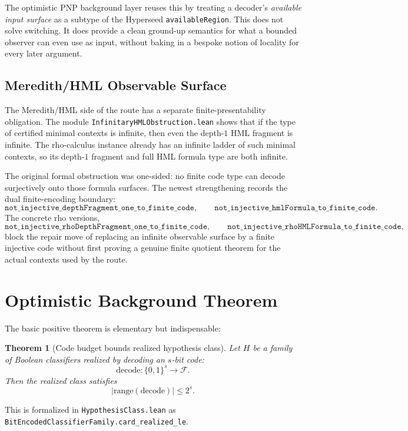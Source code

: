 \documentclass[11pt]{article}
\newtheorem{theorem}{Theorem}[section]
\theoremstyle{remark}
\begin{document}
The optimistic PNP background layer reuses this by treating a decoder's \emph{available
input surface} as a subtype of the Hyperseed \texttt{availableRegion}.  This does not solve
switching.  It does provide a clean ground-up semantics for what a bounded observer can even
use as input, without baking in a bespoke notion of locality for every later argument.

\subsection{Meredith/HML Observable Surface}

The Meredith/HML side of the route has a separate finite-presentability obligation.  The module
\texttt{InfinitaryHMLObstruction.lean} shows that if the type of certified minimal contexts is
infinite, then even the depth-\(1\) HML fragment is infinite.  The rho-calculus instance already
has an infinite ladder of such minimal contexts, so its depth-\(1\) fragment and full HML formula
type are both infinite.

The original formal obstruction was one-sided: no finite code type can decode surjectively onto
those formula surfaces.  The newest strengthening records the dual finite-encoding boundary:
\[
  \texttt{not\_injective\_depthFragment\_one\_to\_finite\_code},
  \qquad
  \texttt{not\_injective\_hmlFormula\_to\_finite\_code}.
\]
The concrete rho versions,
\[
  \texttt{not\_injective\_rhoDepthFragment\_one\_to\_finite\_code},
  \qquad
  \texttt{not\_injective\_rhoHMLFormula\_to\_finite\_code},
\]
block the repair move of replacing an infinite observable surface by a finite injective code
without first proving a genuine finite quotient theorem for the actual contexts used by the route.

\section{Optimistic Background Theorem}

The basic positive theorem is elementary but indispensable:

\begin{theorem}[Code budget bounds realized hypothesis class]
Let \(H\) be a family of Boolean classifiers realized by decoding an \(s\)-bit code:
\[
  \mathrm{decode} : \{0,1\}^s \to \mathcal{F}.
\]
Then the realized class satisfies
\[
  |\mathrm{range}(\mathrm{decode})| \le 2^s.
\]
\end{theorem}

\noindent
This is formalized in \texttt{HypothesisClass.lean} as
\texttt{BitEncodedClassifierFamily.card\_realized\_le}.
\end{document}
